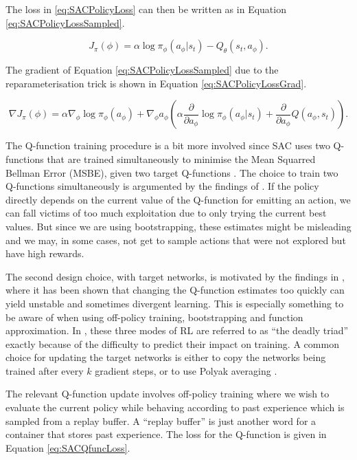 \documentclass{report}
\numberwithin{equation}{section}
\numberwithin{figure}{section}
\numberwithin{table}{section}
\numberwithin{algorithm}{section}
\begin{document}
The loss in \ref{eq:SACPolicyLoss} can then be written as in 
Equation \ref{eq:SACPolicyLossSampled}.

\begin{equation}\label{eq:SACPolicyLossSampled}
  J_\pi(\phi)=\alpha \log \pi_\phi(a_\phi|s_t) - Q_\theta(s_t, a_\phi).
\end{equation}

The gradient of Equation \ref{eq:SACPolicyLossSampled} 
due to the reparameterisation trick is shown in Equation 
\ref{eq:SACPolicyLossGrad}.

\begin{equation}\label{eq:SACPolicyLossGrad}
  \nabla J_\pi(\phi)=\alpha \nabla_\phi \log\pi_\phi(a_\phi)
  + \nabla_\phi a_\phi\left(\alpha\frac{\partial}{\partial a_\phi}
  \log \pi_\phi(a_\phi|s_t)
  + \frac{\partial}{\partial a_\phi}Q(a_\phi, s_t)\right).
\end{equation}



The Q-function training procedure is a bit more involved 
since SAC uses two Q-functions \citep{HasseltDoubleQlearning} 
that are trained simultaneously to 
minimise the Mean Squarred Bellman Error (MSBE), given two 
target Q-functions \citep{DQN}. The choice to train 
two Q-functions simultaneously 
is argumented by the findings of \cite{HasseltDoubleQlearning}. 
If the policy directly depends on the current 
value of the Q-function for emitting an action, we can fall 
victims of too much exploitation due to only trying the current 
best values. But since we are using bootstrapping, these 
estimates might be misleading and we may, in some cases, not 
get to sample actions that were not explored but have 
high rewards.

The second design choice, with target networks, 
is motivated by the findings in \cite{DQN}, 
where it has been shown that changing the Q-function estimates 
too quickly can yield unstable and sometimes divergent learning. 
This is especially something to be aware of when using 
off-policy training, bootstrapping and function approximation.
In \cite{Sutton1998}, these three modes of RL are referred to 
as ``the deadly triad'' exactly because of the difficulty  
to predict their impact on training. A common choice for updating the 
target networks is either to copy the networks being trained 
after every $k$ gradient steps, or to use Polyak averaging 
\citep{PolyakAvg}.

The relevant Q-function update involves off-policy training 
where we wish to evaluate the current policy while behaving 
according to past experience which is sampled from a replay buffer. 
A ``replay buffer'' is just another word for a container that 
stores past experience. 
The loss for the Q-function is given in Equation 
\ref{eq:SACQfuncLoss}.
\end{document}
